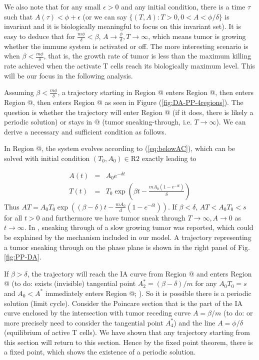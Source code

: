 \documentclass[review,authoryear]{elsarticle}
\makeatletter
\newcommand*{\rom}[1]{\expandafter\@slowromancap\romannumeral #1@}
\makeatother
\begin{document}
We also note that for any small $\epsilon>0$ and any initial condition,
there is a time $\tau$ such that $A(\tau)<\phi+\epsilon$ (or we
can say $\{(T,A):T>0,0<A<\phi/\delta\}$ is invariant and it is biologically
meaningful to focus on this invariant set). It is easy to deduce that
for $\frac{m\phi}{\delta}<\beta$, $A\to\frac{\phi}{\delta},T\to\infty$,
which means tumor is growing whether the immune system is activated
or off. The more interesting scenario is when $\beta<\frac{m\phi}{\delta}$,
that is, the growth rate of tumor is less than the maximum killing
rate achieved when the activate T cells reach its biologically maximum
level. This will be our focus in the following analysis. 

Assuming $\beta<\frac{m\phi}{\delta}$, a trajectory starting in Region \rom{3}
enters Region \rom{4}, then enters Region \rom{1}, then enters Region \rom{2} as seen in Figure (\ref{fig:DA-PP-4regions}).
The question is whether the trajectory will enter Region \rom{3} (if it does,
there is likely a periodic solution) or stays in \rom{2} (tumor sneaking-through,
i.e. $T\to\infty$). We can derive a necessary and sufficient condition
as follows.

In Region \rom{2}, the system evolves according to (\ref{eq:belowAC}), which
can be solved with initial condition $(T_{0},A_{0})\in\text{R2}$
exactly leading to 

\begin{eqnarray}
A(t) & = & A_{0}e^{-\delta t}\nonumber \\
T(t) & = & T_{0}\exp(\beta t-\frac{mA_{0}(1-e^{-\delta t})}{\delta})\label{eq:soln belowAC}
\end{eqnarray}
 Thus $AT=A_{0}T_{0}\exp((\beta-\delta)t-\frac{mA_{0}}{d}(1-e^{-\delta t})).$
If $\beta<\delta$, $AT<A_{0}T_{0}<s$ for all $t>0$ and furthermore
we have tumor sneak through $T\to\infty,A\to0$ as $t\to\infty$.
In \cite{George2018}, sneaking through of a slow growing tumor was
reported, which could be explained by the mechanism included in our
model. A trajectory representing a tumor sneaking through on the phase
plane is shown in the right panel of Fig. \ref{fig:PP-DA}. 

If $\beta>\delta$, the trajectory will reach the IA curve from Region \rom{2}
and enters Region \rom{3} (to do: exists (invisible) tangential point $A_{2}^{*}=(\beta-\delta)/m$
for any $A_{0}T_{0}=s$ and $A_{0}<A^{*}$ immediately enters Region \rom{3};
). So it is possible there is a periodic solution (limit cycle). Consider
the Poincare section that is the part of the IA curve enclosed by
the intersection with tumor receding curve $A=\beta/m$ (to do: or
more precisely need to consider the tangential point $A_{4}^{*}$)
and the line $A=\phi / \delta$ (equilibrium of active T cells).
We have shown that any trajectory starting from this section will
return to this section. Hence by the fixed point theorem, there is
a fixed point, which shows the existence of a periodic solution.
\end{document}
